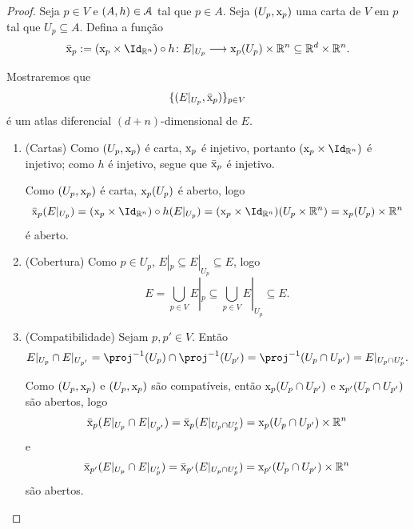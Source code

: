 \begin{proof}
Seja $p \in V$ e $(A,h) \in \mathcal{A}$ tal que $p \in A$. Seja $(U_p,\mathrm{x}_p)$ uma carta de $V$ em $p$ tal que $U_p \subseteq A$. Defina a função
	\begin{equation*}
	\bar\x_p := (\x_p \times \Id_{\R^n}) \circ h \colon E|_{U_p} \to \x_p(U_p) \times \R^n \subseteq \R^d \times \R^n.
	\end{equation*}

Mostraremos que
	\begin{equation*}
	\{(E|_{U_p},\bar{\mathrm{x}}_p)\}_{p \in V}
	\end{equation*}
é um atlas diferencial $(d+n)$-dimensional de $E$.

\begin{enumerate}
\item (Cartas) Como $(U_p,\mathrm{x}_p)$ é carta, $\mathrm{x}_p$ é injetivo, portanto $(\x_p \times \Id_{\R^n})$ é injetivo; como $h$ é injetivo, segue que $\bar{\mathrm{x}}_p$ é injetivo.

Como $(U_p,\mathrm{x}_p)$ é carta, $\mathrm{x}_p(U_p)$ é aberto, logo
	\begin{equation*}
	\bar\x_p(E|_{U_p}) = (\x_p \times \Id_{\R^n}) \circ h (E|_{U_p}) = (\x_p \times \Id_{\R^n})(U_p \times \R^n)  = \x_p(U_p) \times \R^n
	\end{equation*}
é aberto.

\item (Cobertura) Como $p \in U_p$, $E|_p \subseteq E|_{U_p} \subseteq E$, logo
	\begin{equation*}
	E = \bigcup_{p \in V} E|_p \subseteq \bigcup_{p \in V} E|_{U_p} \subseteq E.
	\end{equation*}

\item (Compatibilidade) Sejam $p,p' \in V$. Então
	\begin{equation*}
	E|_{U_p} \cap E|_{U_{p'}} = \proj\inv(U_p) \cap \proj\inv(U_{p'}) = \proj\inv(U_p \cap U_{p'}) = E|_{U_p \cap U_p'}.
	\end{equation*}

Como $(U_p,\mathrm{x}_p)$ e $(U_p,\mathrm{x}_p)$ são compatíveis, então $\mathrm{x}_p(U_p \cap U_{p'})$ e $\mathrm{x}_{p'}(U_p \cap U_{p'})$ são abertos, logo
	\begin{equation*}
	\bar{\mathrm{x}}_p (E|_{U_p} \cap E|_{U_{p'}}) = \bar{\mathrm{x}}_p (E|_{U_p \cap U_p'}) = \mathrm{x}_p(U_p \cap U_{p'}) \times \mathbb{R}^n
	\end{equation*}
e
	\begin{equation*}
	\bar{\mathrm{x}}_{p'} (E|_{U_p} \cap E|_{U_p'}) = \bar{\mathrm{x}}_{p'} (E|_{U_p \cap U_p'}) = \mathrm{x}_{p'}(U_p \cap U_{p'}) \times \mathbb{R}^n
	\end{equation*}
são abertos.


\end{enumerate}
\end{proof}
